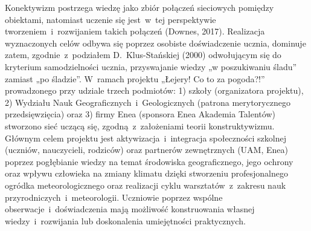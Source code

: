 \documentclass[\main/boa.tex]{subfiles}
\begin{document}
Konektywizm postrzega wiedzę jako zbiór połączeń sieciowych pomiędzy obiektami, natomiast uczenie się jest~w~tej perspektywie tworzeniem~i~rozwijaniem takich połączeń (Downes, 2017). Realizacja wyznaczonych celów odbywa się poprzez osobiste doświadczenie ucznia, dominuje zatem, zgodnie~z~podziałem D. Klus-Stańskiej (2000) odwołującym się do kryterium samodzielności ucznia, przyswajanie wiedzy „w poszukiwaniu śladu” zamiast „po śladzie”.  W ramach projektu „Łejery! Co to za pogoda?!” prowadzonego przy udziale trzech podmiotów: 1) szkoły (organizatora projektu), 2) Wydziału Nauk Geograficznych~i~Geologicznych (patrona merytorycznego przedsięwzięcia) oraz 3) firmy Enea (sponsora Enea Akademia Talentów) stworzono sieć uczącą się, zgodną~z~założeniami teorii konstruktywizmu. Głównym celem projektu jest aktywizacja~i~integracja społeczności szkolnej (uczniów, nauczycieli, rodziców) oraz partnerów zewnętrznych (UAM, Enea) poprzez pogłębianie wiedzy na temat środowiska geograficznego, jego ochrony oraz wpływu człowieka na zmiany klimatu dzięki stworzeniu profesjonalnego ogródka meteorologicznego oraz realizacji cyklu warsztatów~z~zakresu nauk przyrodniczych~i~meteorologii. Uczniowie poprzez wspólne obserwacje~i~doświadczenia mają możliwość konstruowania własnej wiedzy~i~rozwijania lub doskonalenia umiejętności praktycznych. 
\end{document}
